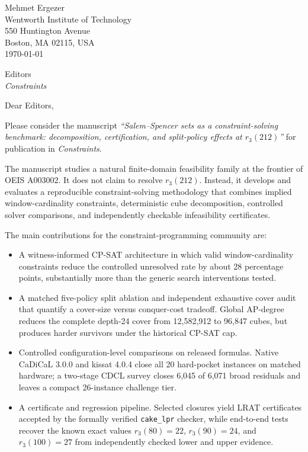 \documentclass[10pt]{article}
\begin{document}
\begin{flushright}
Mehmet Ergezer\\
Wentworth Institute of Technology\\
550 Huntington Avenue\\
Boston, MA 02115, USA\\
\today
\end{flushright}

Editors\\
\textit{Constraints}

Dear Editors,

Please consider the manuscript
\textit{``Salem--Spencer sets as a constraint-solving benchmark:
decomposition, certification, and split-policy effects at $r_3(212)$''}
for publication in \textit{Constraints}.

The manuscript studies a natural finite-domain feasibility family at the
frontier of OEIS A003002. It does not claim to resolve $r_3(212)$. Instead,
it develops and evaluates a reproducible constraint-solving methodology that
combines implied window-cardinality constraints, deterministic cube
decomposition, controlled solver comparisons, and independently checkable
infeasibility certificates.

The main contributions for the constraint-programming community are:

\begin{itemize}
\item A witness-informed CP-SAT architecture in which valid
  window-cardinality constraints reduce the controlled unresolved rate by
  about 28 percentage points, substantially more than the generic search
  interventions tested.
\item A matched five-policy split ablation and independent exhaustive cover
  audit that quantify a cover-size versus conquer-cost tradeoff. Global
  AP-degree reduces the complete depth-24 cover from 12,582,912 to 96,847
  cubes, but produces harder survivors under the historical CP-SAT cap.
\item Controlled configuration-level comparisons on released formulas.
  Native CaDiCaL 3.0.0 and kissat 4.0.4 close all 20 hard-pocket instances
  on matched hardware; a two-stage CDCL survey closes 6,045 of 6,071 broad
  residuals and leaves a compact 26-instance challenge tier.
\item A certificate and regression pipeline. Selected closures yield LRAT
  certificates accepted by the formally verified \texttt{cake\_lpr}
  checker, while end-to-end tests recover the known exact values
  $r_3(80)=22$, $r_3(90)=24$, and $r_3(100)=27$ from independently checked
  lower and upper evidence.
\end{itemize}
\end{document}
